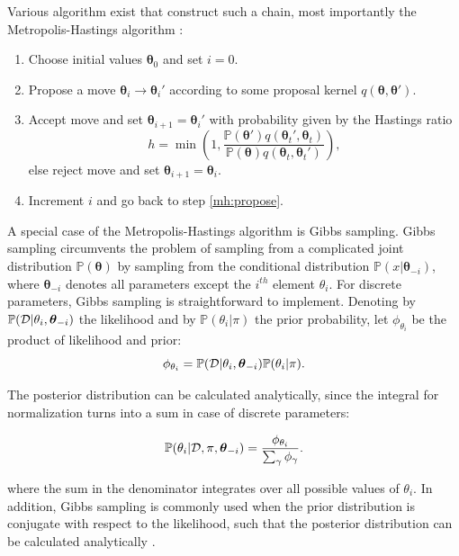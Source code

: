 \documentclass[a4paper,11pt]{article}
\def\btheta{\boldsymbol{\theta}}
\def\D{{\cal D}}
\def\p{\mathbb{P}}
\begin{document}
Various algorithm exist that construct such a chain, most importantly the Metropolis-Hastings algorithm \citep{Metropolis1953, Hastings1970}:
\begin{enumerate}
 \item Choose initial values $\btheta_0$ and set $i=0$.
 \item Propose a move $\btheta_i \to \btheta_i'$ according to some proposal kernel $q(\btheta, \btheta')$. \label{mh:propose}
 \item Accept move and set $\btheta_{i+1}=\btheta_i'$ with probability given by the Hastings ratio \begin{equation*}\label{eq:hastingratio} h=\min\left(1,\frac{\p(\btheta')q(\btheta_t',\btheta_t)}{\p(\btheta)q(\btheta_t, \btheta_t')}\right), \end{equation*} else reject move and set $\btheta_{i+1}=\btheta_i$.
\item Increment $i$ and go back to step \ref{mh:propose}. \label{mh:accept}
\end{enumerate}
A special case of the Metropolis-Hastings algorithm is Gibbs sampling. Gibbs sampling circumvents the problem of sampling from a complicated joint distribution $\p(\btheta)$ by sampling from the conditional distribution $\p(x | \btheta_{-i})$, where $\btheta_{-i}$ denotes all parameters except the $i^{th}$ element $\theta_i$. For discrete parameters, Gibbs sampling is straightforward to implement. Denoting by $\p(\D | \theta_i, \btheta_{-i})$ the likelihood and by $\p(\theta_i | \pi)$ the prior probability, let $\phi_{\theta_i}$ be the product of likelihood and prior:
\begin{equation*}
 \phi_{\theta_i} = \p(\D | \theta_i, \btheta_{-i}) \p(\theta_i | \pi).
\end{equation*}

The posterior distribution can be calculated analytically, since the integral for normalization turns into a sum in case of discrete parameters:

\begin{equation}\label{eq:posterior}
 \p(\theta_i | \D, \pi, \btheta_{-i}) = \frac{\phi_{\theta_i}}{\sum_{\gamma} \phi_{\gamma}}.
\end{equation}

where the sum in the denominator integrates over all possible values of $\theta_i$.
In addition, Gibbs sampling is commonly used when the prior distribution is conjugate with respect to the likelihood, such that the posterior distribution can be calculated analytically \citep{murphy2012}.
\end{document}
